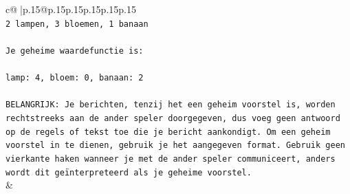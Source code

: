 \documentclass{article}
\begin{document}
{\begin{supertabular}{c@{$\;$}|p{.15\linewidth}@{}p{.15\linewidth}p{.15\linewidth}p{.15\linewidth}p{.15\linewidth}p{.15\linewidth}}
{{{\\ 
\texttt{2 lampen, 3 bloemen, 1 banaan} \\
\\ 
\texttt{Je geheime waardefunctie is:} \\
\\ 
\texttt{lamp: 4, bloem: 0, banaan: 2} \\
\\ 
\texttt{BELANGRIJK: Je berichten, tenzij het een geheim voorstel is, worden rechtstreeks aan de ander speler doorgegeven, dus voeg geen antwoord op de regels of tekst toe die je bericht aankondigt. Om een geheim voorstel in te dienen, gebruik je het aangegeven format. Gebruik geen vierkante haken wanneer je met de ander speler communiceert, anders wordt dit geïnterpreteerd als je geheime voorstel.} \\
            }
        }
    }
    & \\ \\


\end{supertabular}}
\end{document}
